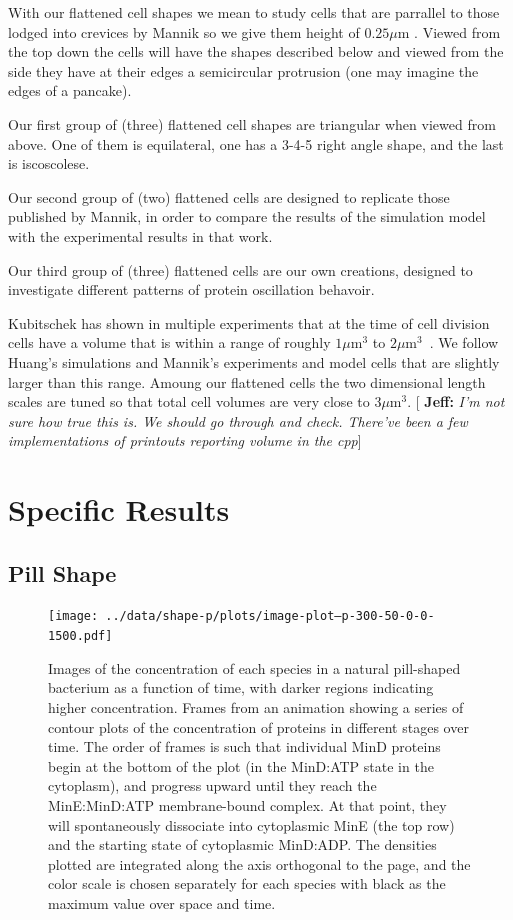 \documentclass[letterpaper,twocolumn,amsmath,amssymb,pre]{revtex4-1}
\newcommand{\blue}[1]{{\bf \color{blue} #1}}
\newcommand{\jeffsays}[1]{{\color{red} [\blue{Jeff:} \emph{#1}]}}
\newcommand\micron{\ensuremath{\mu\text{m}}}
\begin{document}
With our flattened cell shapes we mean to study cells that are
parrallel to those lodged into crevices by Mannik so we give them
height of $0.25\micron$ \cite{mannik2012robustness}.  Viewed from the top
down the cells will have the shapes described below and viewed from
the side they have at their edges a semicircular protrusion (one may
imagine the edges of a pancake).

Our first group of (three) flattened cell shapes are triangular when
viewed from above.  One of them is equilateral, one has a 3-4-5 right
angle shape, and the last is iscoscolese.

Our second group of (two) flattened cells are designed to replicate
those published by Mannik, in order to compare the results of the
simulation model with the experimental results in that work.

Our third group of (three) flattened cells are our own creations,
designed to investigate different patterns of protein oscillation
behavoir.

Kubitschek has shown in multiple experiments that at the time of cell
division cells have a volume that is within a range of roughly
$1\micron^3$ to $2\micron^3$~\cite{kubitschek1990cell,
  kubitschek1968linear}.  We follow Huang's
simulations\cite{huang2003dynamic} and Mannik's experiments and model
cells that are slightly larger than this range.  Amoung our flattened
cells the two dimensional length scales are tuned so that total cell
volumes are very close to $3\micron^3$. \jeffsays{I'm not sure how
  true this is.  We should go through and check.  There've been a few
  implementations of printouts reporting volume in the cpp}
\section{Specific Results}

\subsection{Pill Shape}


\begin{figure}
  \texttt{[image: ../data/shape-p/plots/image-plot--p-300-50-0-0-1500.pdf]}
  \caption{Images of the concentration of each species in a natural
    pill-shaped bacterium as a function of time, with darker regions
    indicating higher concentration.  Frames from an animation showing
    a series of contour plots of the concentration of proteins in
    different stages over time.  The order of frames is such that
    individual MinD proteins begin at the bottom of the plot (in the
    MinD:ATP state in the cytoplasm), and progress upward until they
    reach the MinE:MinD:ATP membrane-bound complex.  At that point,
    they will spontaneously dissociate into cytoplasmic MinE (the top
    row) and the starting state of cytoplasmic MinD:ADP.  The
    densities plotted are integrated along the axis orthogonal to the
    page, and the color scale is chosen separately for each species
    with black as the maximum value over space and time.}
  \label{image-p}
\end{figure}
\end{document}
